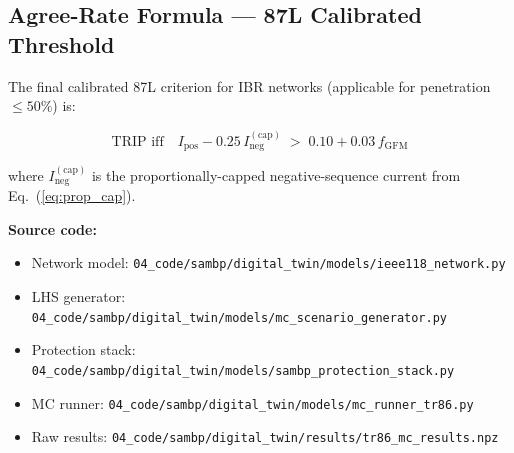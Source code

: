 \documentclass[11pt,a4paper]{article}
\begin{document}
\subsection{Agree-Rate Formula — 87L Calibrated Threshold}

The final calibrated 87L criterion for IBR networks (applicable for
penetration $\leq 50\%$) is:

\begin{equation}
  \boxed{
    \text{TRIP iff} \quad
    I_{\text{pos}} - 0.25\,I_{\text{neg}}^{(\text{cap})} \;>\; 0.10 + 0.03\,f_{\text{GFM}}
  }
  \label{eq:87L_final}
\end{equation}

where $I_{\text{neg}}^{(\text{cap})}$ is the proportionally-capped
negative-sequence current from Eq.~(\ref{eq:prop_cap}).

\bigskip
\noindent\textbf{Source code:}
\begin{itemize}
  \item Network model: \texttt{04\_code/sambp/digital\_twin/models/ieee118\_network.py}
  \item LHS generator: \texttt{04\_code/sambp/digital\_twin/models/mc\_scenario\_generator.py}
  \item Protection stack: \texttt{04\_code/sambp/digital\_twin/models/sambp\_protection\_stack.py}
  \item MC runner: \texttt{04\_code/sambp/digital\_twin/models/mc\_runner\_tr86.py}
  \item Raw results: \texttt{04\_code/sambp/digital\_twin/results/tr86\_mc\_results.npz}
\end{itemize}



\end{document}
